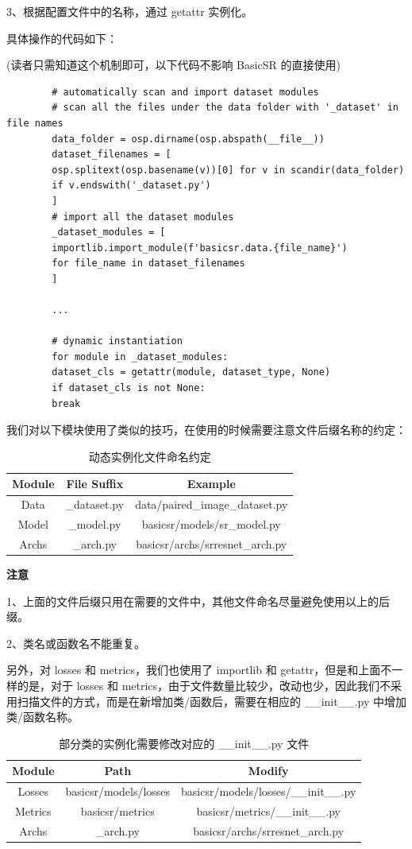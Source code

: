 \documentclass[../main.tex]{subfiles}
\begin{document}
	3、根据配置文件中的名称，通过 getattr 实例化。
	
	具体操作的代码如下： 
	
	(读者只需知道这个机制即可，以下代码不影响 BasicSR 的直接使用)
	\begin{verbatim}
		# automatically scan and import dataset modules
		# scan all the files under the data folder with '_dataset' in file names
		data_folder = osp.dirname(osp.abspath(__file__))
		dataset_filenames = [
		osp.splitext(osp.basename(v))[0] for v in scandir(data_folder)
		if v.endswith('_dataset.py')
		]
		# import all the dataset modules
		_dataset_modules = [
		importlib.import_module(f'basicsr.data.{file_name}')
		for file_name in dataset_filenames
		]
		
		...
		
		# dynamic instantiation
		for module in _dataset_modules:
		dataset_cls = getattr(module, dataset_type, None)
		if dataset_cls is not None:
		break
	\end{verbatim}
	
	我们对以下模块使用了类似的技巧，在使用的时候需要注意文件后缀名称的约定：
	\begin{table}[h]
		\centering
		\begin{tabular}{|c|c|c|}
			\hline
			\textbf{Module} & \textbf{File Suffix} & \textbf{Example} \\ \hline
			Data & \_dataset.py & data/paired\_image\_dataset.py \\ \hline
			Model & \_model.py & basicsr/models/sr\_model.py \\ \hline
			Archs & \_arch.py & basicsr/archs/srresnet\_arch.py \\ \hline
		\end{tabular}
		\caption{动态实例化文件命名约定}
	\end{table}
	
	\begin{hl} %
		\textbf{注意}
		
		1、上面的文件后缀只用在需要的文件中，其他文件命名尽量避免使用以上的后缀。
		
		2、类名或函数名不能重复。
	\end{hl}
	
	另外，对 losses 和 metrics，我们也使用了 importlib 和 getattr，但是和上面不一样的是，对于 losses 和 metrics，由于文件数量比较少，改动也少，因此我们不采用扫描文件的方式，而是在新增加类/函数后，需要在相应的 \_\_init\_\_.py 中增加类/函数名称。
	\begin{table}[h]
		\centering
		\begin{tabular}{|c|c|c|}
			\hline
			\textbf{Module} & \textbf{Path} & \textbf{Modify} \\ \hline
			Losses & basicsr/models/losses & basicsr/models/losses/\_\_init\_\_.py \\ \hline
			Metrics & basicsr/metrics & basicsr/metrics/\_\_init\_\_.py \\ \hline
			Archs & \_arch.py & basicsr/archs/srresnet\_arch.py \\ \hline
		\end{tabular}
		\caption{部分类的实例化需要修改对应的 \_\_init\_\_.py 文件}
	\end{table}
	
\end{document}
